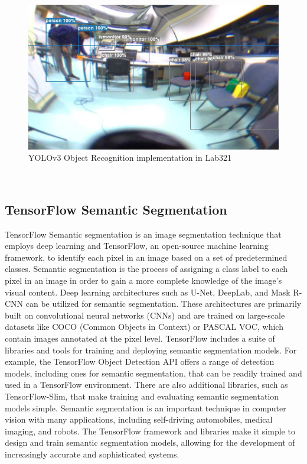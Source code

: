 \documentclass[11pt, a4paper, openany]{book}
\begin{document}
 \begin{figure}[H]
    \centering
    \includegraphics[scale=0.6]{Labbot&ele/test2.png}
    \caption{YOLOv3 Object Recognition implementation in Lab321}
    \label{fig:back} 
\end{figure}\
\subsection{TensorFlow Semantic Segmentation}
TensorFlow Semantic segmentation is an image segmentation technique that employs deep learning and TensorFlow, an open-source machine learning framework, to identify each pixel in an image based on a set of predetermined classes. Semantic segmentation is the process of assigning a class label to each pixel in an image in order to gain a more complete knowledge of the image's visual content.\newline
Deep learning architectures such as U-Net, DeepLab, and Mask R-CNN can be utilized for semantic segmentation. These architectures are primarily built on convolutional neural networks (CNNs) and are trained on large-scale datasets like COCO (Common Objects in Context) or PASCAL VOC, which contain images annotated at the pixel level.\newline
TensorFlow includes a suite of libraries and tools for training and deploying semantic segmentation models. For example, the TensorFlow Object Detection API offers a range of detection models, including ones for semantic segmentation, that can be readily trained and used in a TensorFlow environment. There are also additional libraries, such as TensorFlow-Slim, that make training and evaluating semantic segmentation models simple.\cite{zafar2018hands}\newline
Semantic segmentation is an important technique in computer vision with many applications, including self-driving automobiles, medical imaging, and robots. The TensorFlow framework and libraries make it simple to design and train semantic segmentation models, allowing for the development of increasingly accurate and sophisticated systems.
\end{document}
